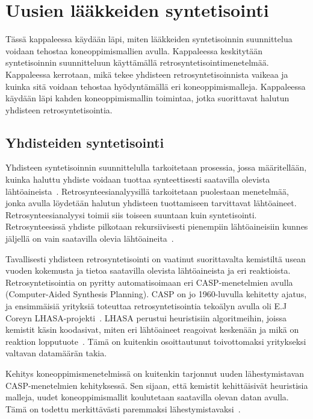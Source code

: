 \documentclass[finnish,twoside,censored,tkt,sw-line]{HYthesisML}
\begin{document}
\chapter{Uusien lääkkeiden syntetisointi}

Tässä kappaleessa käydään läpi, miten lääkkeiden syntetisoinnin suunnittelua voidaan tehostaa koneoppimismallien avulla.
Kappaleessa keskitytään syntetisoinnin suunnitteluun käyttämällä retrosyntetisointimenetelmää.
Kappaleessa kerrotaan, mikä tekee yhdisteen retrosyntetisoinnista vaikeaa ja kuinka sitä voidaan tehostaa hyödyntämällä eri koneoppimismalleja.
Kappaleessa käydään läpi kahden koneoppimismallin toimintaa, jotka suorittavat halutun yhdisteen retrosyntetisointia.

\section{Yhdisteiden syntetisointi}

Yhdisteen syntetisoinnin suunnittelulla tarkoitetaan prosessia, jossa määritellään, kuinka haluttu yhdiste voidaan tuottaa synteettisesti saatavilla olevista lähtöaineista~\cite{ColeyConnorW2018MLiC}.
Retrosynteesianalyysillä tarkoitetaan puolestaan menetelmää, jonka avulla löydetään halutun yhdisteen tuottamiseen tarvittavat lähtöaineet.
Retrosynteesianalyysi toimii siis toiseen suuntaan kuin syntetisointi.
Retrosynteesissä yhdiste pilkotaan rekursiivisesti pienempiin lähtöaineisiin kunnes jäljellä on vain saatavilla olevia lähtöaineita~\cite{ECoreyRetrosynthesis}.

Tavallisesti yhdisteen retrosyntetisointi on vaatinut suorittavalta kemistiltä usean vuoden kokemusta ja tietoa saatavilla olevista lähtöaineista ja eri reaktioista.
Retrosyntetisointia on pyritty automatisoimaan eri CASP-menetelmien avulla (Computer-Aided Synthesis Planning).
CASP on jo 1960-luvulla kehitetty ajatus, ja ensimmäisiä yrityksiä toteuttaa retrosyntetisointia tekoälyn avulla oli E.J Coreyn LHASA-projekti~\cite{ColeyConnorW2018MLiC}.
LHASA perustui heuristisiin algoritmeihin, joissa kemistit käsin koodasivat, miten eri lähtöaineet reagoivat keskenään ja mikä on reaktion lopputuote~\cite{LHASA}.
Tämä on kuitenkin osoittautunut toivottomaksi yritykseksi valtavan datamäärän takia.

Kehitys koneoppimismenetelmissä on kuitenkin tarjonnut uuden lähestymistavan CASP-menetelmien kehityksessä.
Sen sijaan, että kemistit kehittäisivät heuristisia malleja, uudet koneoppimismallit koulutetaan saatavilla olevan datan avulla.
Tämä on todettu merkittävästi paremmaksi lähestymistavaksi~\cite{ColeyConnorW2018MLiC}.
\end{document}
